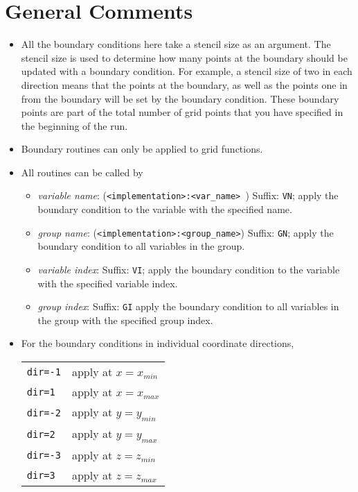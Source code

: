 \documentclass{article}
\newcommand{\entrylabel}[1]{\mbox{\textsf{#1}}\hfil}
\newenvironment{entry}
  {\begin{list}{}
    {\renewcommand{\makelabel}{\entrylabel}
      \setlength{\labelwidth}{90pt}
      \setlength{\leftmargin}{\labelwidth+\labelsep}
    }
  }
  {\end{list}}
\newlength{\Mylen}
\newcommand{\Lentrylabel}[1]{%
  \settowidth{\Mylen}{\textsf{#1}}%
  \ifthenelse{\lengthtest{\Mylen > \labelwidth}}%
    {\parbox[b]{\labelwidth} %
      {\makebox[0pt][l]{\textsf{#1}}\\}} %
    {\textsf{#1}} %

  \hfil\relax}
\newenvironment{Lentry}
  {\renewcommand{\entrylabel}{\Lentrylabel}
   \begin{entry}}
  {\end{entry}}
\begin{document}
\section{General Comments}
\begin{itemize}
\item{}
All the boundary conditions here take a stencil size as an 
argument. The stencil size is used to determine how many points
at the boundary should be updated with a boundary condition.
For example, a stencil size of two in each direction means
that the points at the boundary, as well as the points one in from the boundary
will be set by the boundary condition. These boundary points are part
of the total number of grid points that you have specified in the
beginning of the run.
\item{} 
Boundary routines can only be applied to grid functions. 
\item{}
All routines can be called by
\begin{itemize}
\item{\em variable name}: ({\tt <implementation>:<var\_name> }) Suffix:
{\tt VN}; apply the boundary condition to the variable with the
specified name.
\item{\em group name}: ({\tt <implementation>:<group\_name>}) Suffix:
{\tt GN}; apply the boundary condition to all variables in the group.
\item{\em variable index}:  Suffix: {\tt VI}; apply the boundary
condition to the variable with the specified variable index.
\item{\em group index}:  Suffix: {\tt GI} apply the boundary
condition to all variables in the group with the specified group index.
\end{itemize}
\item{} For the boundary conditions in individual coordinate directions, 

\begin{tabular}{ll}
{\tt dir=-1} & apply at $x=x_{min}$ \\
{\tt dir=1} & apply at $x=x_{max}$ \\
{\tt dir=-2} & apply at $y=y_{min}$ \\
{\tt dir=2} & apply at $y=y_{max}$ \\
{\tt dir=-3} & apply at $z=z_{min}$ \\
{\tt dir=3} & apply at $z=z_{max}$ \\
\end{tabular} 

\end{itemize}
\end{document}
